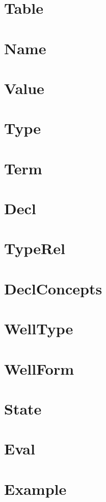 \documentclass[11pt,a4paper]{book}
\begin{document}
\chapter{Table}
    

\chapter{Name}

\chapter{Value}     

\chapter{Type}
      
\chapter{Term}
     
\chapter{Decl}
          
\chapter{TypeRel}
   
\chapter{DeclConcepts}
  

\chapter{WellType}

\chapter{WellForm}


\chapter{State}
    
\chapter{Eval}
          

\chapter{Example}
  
\end{document}
